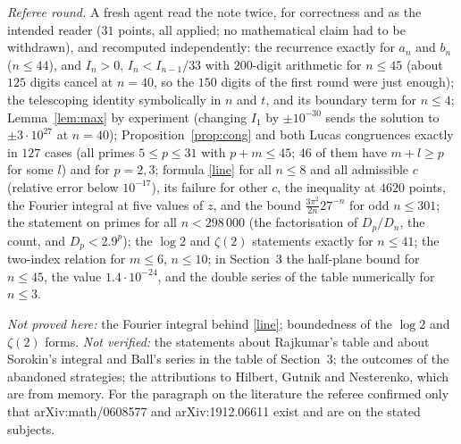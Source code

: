\documentclass[11pt]{article}
\begin{document}
\emph{Referee round.} A fresh agent read the note twice, for correctness and as the intended reader
($31$ points, all applied; no mathematical claim had to be withdrawn), and recomputed
independently: the recurrence exactly for $a_n$ and $b_n$ ($n\le44$), and $I_n>0$,
$I_n<I_{n-1}/33$ with $200$-digit arithmetic for $n\le45$ (about $125$ digits cancel at $n=40$, so
the $150$ digits of the first round were just enough); the telescoping identity symbolically in $n$
and $t$, and its boundary term for $n\le4$; Lemma~\ref{lem:max} by experiment (changing $I_1$ by
$\pm10^{-30}$ sends the solution to $\pm3\cdot10^{27}$ at $n=40$); Proposition~\ref{prop:cong} and
both Lucas congruences exactly in $127$ cases (all primes $5\le p\le31$ with $p+m\le45$; $46$ of
them have $m+l\ge p$ for some $l$) and for $p=2,3$; formula \eqref{line} for all $n\le8$ and all
admissible $c$ (relative error below $10^{-17}$), its failure for other $c$, the inequality at
$4620$ points, the Fourier integral at five values of $z$, and the bound
$\frac{3\pi^2}{2n}27^{-n}$ for odd $n\le301$; the statement on primes for all $n<298\,000$ (the
factorisation of $D_p/D_n$, the count, and $D_p<2.9^p$); the $\log2$ and $\zeta(2)$ statements
exactly for $n\le41$; the two-index relation for $m\le6$, $n\le10$; in Section~3 the half-plane
bound for $n\le45$, the value $1.4\cdot10^{-24}$, and the double series of the table numerically for
$n\le3$.

\emph{Not proved here:} the Fourier integral behind \eqref{line}; boundedness of the $\log2$ and
$\zeta(2)$ forms. \emph{Not verified:} the statements about Rajkumar's table and about Sorokin's
integral and Ball's series in the table of Section~3; the outcomes of the abandoned strategies; the
attributions to Hilbert, Gutnik and Nesterenko, which are from memory. For the paragraph on the
literature the referee confirmed only that arXiv:math/0608577 and arXiv:1912.06611 exist and are on
the stated subjects.
\end{document}
